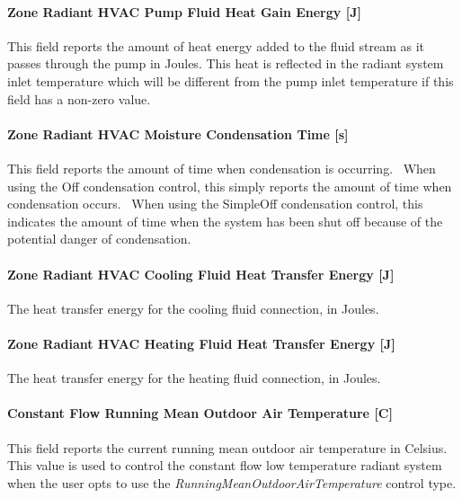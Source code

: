 \paragraph{Zone Radiant HVAC Pump Fluid Heat Gain Energy {[}J{]}}\label{zone-radiant-hvac-pump-fluid-heat-gain-energy-j}

This field reports the amount of heat energy added to the fluid stream as it passes through the pump in Joules. This heat is reflected in the radiant system inlet temperature which will be different from the pump inlet temperature if this field has a non-zero value.

\paragraph{Zone Radiant HVAC Moisture Condensation Time {[}s{]}}\label{zone-radiant-hvac-moisture-condensation-time-s}

This field reports the amount of time when condensation is occurring.~ When using the Off condensation control, this simply reports the amount of time when condensation occurs.~ When using the SimpleOff condensation control, this indicates the amount of time when the system has been shut off because of the potential danger of condensation.

\paragraph{Zone Radiant HVAC Cooling Fluid Heat Transfer Energy {[}J{]}}\label{zone-radiant-hvac-cooling-fluid-heat-transfer-energy-j}

The heat transfer energy for the cooling fluid connection, in Joules.

\paragraph{Zone Radiant HVAC Heating Fluid Heat Transfer Energy {[}J{]}}\label{zone-radiant-hvac-heating-fluid-heat-transfer-energy-j}

The heat transfer energy for the heating fluid connection, in Joules.

\paragraph{Constant Flow Running Mean Outdoor Air Temperature {[}C{]}}\label{constant-flow-running-mean-outdoor-air-temperature-1}

This field reports the current running mean outdoor air temperature in Celsius. This value is used to control the constant flow low temperature radiant system when the user opts to use the \emph{RunningMeanOutdoorAirTemperature} control type.

